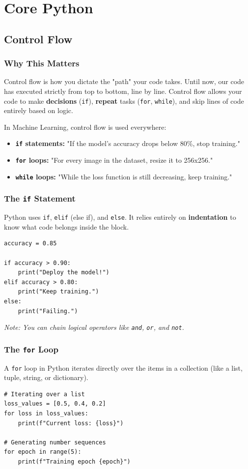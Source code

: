 \part{Core Python}

\chapter{Control Flow}

\section{Why This Matters}
Control flow is how you dictate the "path" your code takes. Until now, our code has executed strictly from top to bottom, line by line. Control flow allows your code to make \textbf{decisions} (\texttt{if}), \textbf{repeat} tasks (\texttt{for}, \texttt{while}), and skip lines of code entirely based on logic.

In Machine Learning, control flow is used everywhere:
\begin{itemize}
    \item \textbf{\texttt{if} statements:} "If the model's accuracy drops below 80\%, stop training."
    \item \textbf{\texttt{for} loops:} "For every image in the dataset, resize it to 256x256."
    \item \textbf{\texttt{while} loops:} "While the loss function is still decreasing, keep training."
\end{itemize}

\section{The \texttt{if} Statement}
Python uses \texttt{if}, \texttt{elif} (else if), and \texttt{else}. It relies entirely on \textbf{indentation} to know what code belongs inside the block.

\begin{lstlisting}
accuracy = 0.85

if accuracy > 0.90:
    print("Deploy the model!")
elif accuracy > 0.80:
    print("Keep training.")
else:
    print("Failing.")
\end{lstlisting}
\textit{Note: You can chain logical operators like \texttt{and}, \texttt{or}, and \texttt{not}.}

\section{The \texttt{for} Loop}
A \texttt{for} loop in Python iterates directly over the items in a collection (like a list, tuple, string, or dictionary).
\begin{lstlisting}
# Iterating over a list
loss_values = [0.5, 0.4, 0.2]
for loss in loss_values:
    print(f"Current loss: {loss}")

# Generating number sequences
for epoch in range(5):
    print(f"Training epoch {epoch}")
\end{lstlisting}

